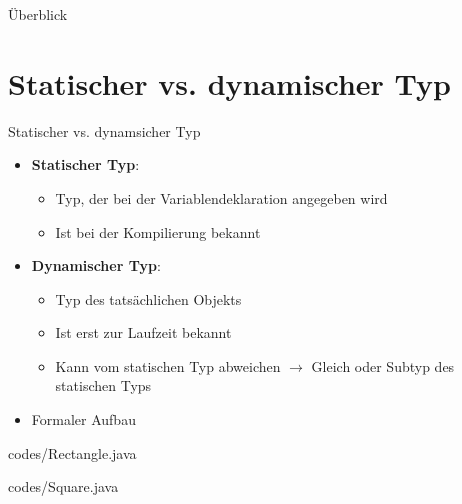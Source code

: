 \documentclass{../tuda-beamer}
\date{01. Dezember 2021}
\begin{document}
    \maketitle

    \begin{frame}{Überblick}
        \tableofcontents
    \end{frame}


    \section{Statischer vs. dynamischer Typ}
    \begin{frame}{Statischer vs. dynamsicher Typ}
        \begin{itemize}
            \item \textbf{Statischer Typ}:
            \begin{itemize}
                \item Typ, der bei der Variablendeklaration angegeben wird
                \item Ist bei der Kompilierung bekannt
            \end{itemize}
            \item \textbf{Dynamischer Typ}:
            \begin{itemize}
                \item Typ des tatsächlichen Objekts
                \item Ist erst zur Laufzeit bekannt
                \item Kann vom statischen Typ abweichen \(\rightarrow\) Gleich oder Subtyp des statischen
                Typs
            \end{itemize}
            \item Formaler Aufbau
            \begin{center}
            \end{center}
        \end{itemize}
    \end{frame}

    \begin{frame}
         {codes/Rectangle.java}
    \end{frame}

    \begin{frame}
         {codes/Square.java}
    \end{frame}
\end{document}
